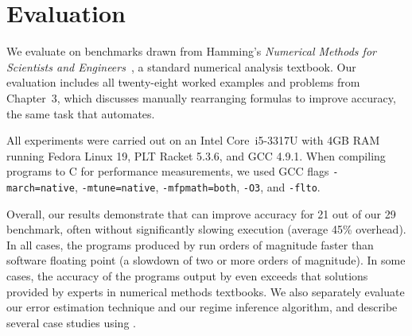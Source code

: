 \documentclass[paper.tex]{subfiles}
\begin{document}
\section{Evaluation}
\label{sec:evaluation}

We evaluate \casio on benchmarks drawn from Hamming's \emph{Numerical
  Methods for Scientists and Engineers}~\cite{book87-nmse}, a standard
numerical analysis textbook.  Our evaluation includes all twenty-eight
worked examples and problems from Chapter~3, which discusses manually
rearranging formulas to improve accuracy, the same task that \casio
automates.

All experiments were carried out on an Intel Core~i5-3317U with 4GB
RAM running Fedora Linux 19, PLT Racket 5.3.6, and GCC 4.9.1.  When
compiling programs to C for performance measurements, we used GCC
flags \texttt{-march=native}, \texttt{-mtune=native},
\texttt{-mfpmath=both}, \texttt{-O3}, and \texttt{-flto}.

Overall, our results demonstrate that \casio can improve accuracy for
21 out of our 29 benchmark, often
without significantly slowing execution (average 45\% overhead).
In all cases, the programs produced by \casio run orders of
magnitude faster than software floating point
(a slowdown of two or more orders of magnitude).  In some cases, the accuracy of the programs output
by \casio even exceeds that solutions provided by experts in numerical
methods textbooks.  We also separately evaluate our error estimation
technique and our regime inference algorithm, and describe several
case studies using \casio.
\end{document}
